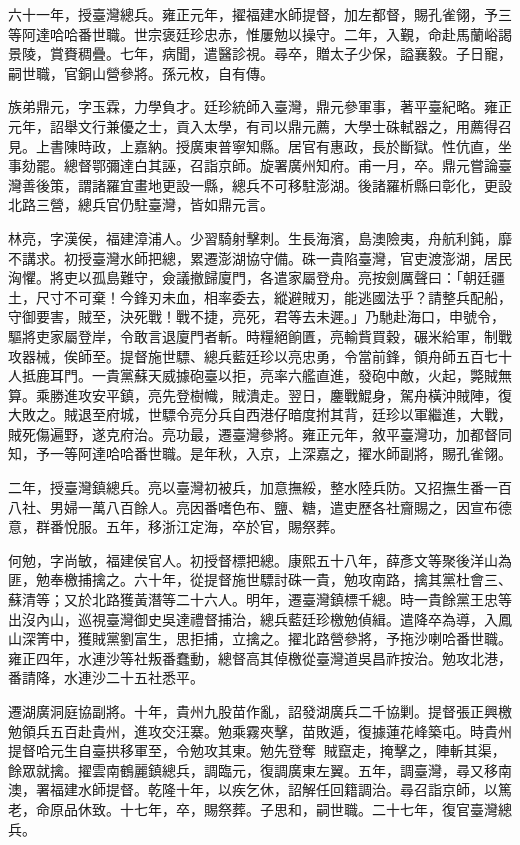 \begin{pinyinscope}
六十一年，授臺灣總兵。雍正元年，擢福建水師提督，加左都督，賜孔雀翎，予三等阿達哈哈番世職。世宗褒廷珍忠赤，惟屢勉以操守。二年，入覲，命赴馬蘭峪謁景陵，賞賚稠疊。七年，病聞，遣醫診視。尋卒，贈太子少保，謚襄毅。子日寵，嗣世職，官銅山營參將。孫元枚，自有傳。

族弟鼎元，字玉霖，力學負才。廷珍統師入臺灣，鼎元參軍事，著平臺紀略。雍正元年，詔舉文行兼優之士，貢入太學，有司以鼎元薦，大學士硃軾器之，用薦得召見。上書陳時政，上嘉納。授廣東普寧知縣。居官有惠政，長於斷獄。性伉直，坐事劾罷。總督鄂彌達白其誣，召詣京師。旋署廣州知府。甫一月，卒。鼎元嘗論臺灣善後策，謂諸羅宜畫地更設一縣，總兵不可移駐澎湖。後諸羅析縣曰彰化，更設北路三營，總兵官仍駐臺灣，皆如鼎元言。

林亮，字漢侯，福建漳浦人。少習騎射擊刺。生長海濱，島澳險夷，舟航利鈍，靡不講求。初授臺灣水師把總，累遷澎湖協守備。硃一貴陷臺灣，官吏渡澎湖，居民洶懼。將吏以孤島難守，僉議撤歸廈門，各遣家屬登舟。亮按劍厲聲曰：「朝廷疆土，尺寸不可棄！今鋒刃未血，相率委去，縱避賊刃，能逃國法乎？請整兵配船，守御要害，賊至，決死戰！戰不捷，亮死，君等去未遲。」乃馳赴海口，申號令，驅將吏家屬登岸，令敢言退廈門者斬。時糧絕餉匱，亮輸貲買穀，碾米給軍，制戰攻器械，俟師至。提督施世驃、總兵藍廷珍以亮忠勇，令當前鋒，領舟師五百七十人抵鹿耳門。一貴黨蘇天威據砲臺以拒，亮率六艦直進，發砲中敵，火起，斃賊無算。乘勝進攻安平鎮，亮先登樹幟，賊潰走。翌日，鏖戰鯤身，駕舟橫沖賊陣，復大敗之。賊退至府城，世驃令亮分兵自西港仔暗度拊其背，廷珍以軍繼進，大戰，賊死傷遍野，遂克府治。亮功最，遷臺灣參將。雍正元年，敘平臺灣功，加都督同知，予一等阿達哈哈番世職。是年秋，入京，上深嘉之，擢水師副將，賜孔雀翎。

二年，授臺灣鎮總兵。亮以臺灣初被兵，加意撫綏，整水陸兵防。又招撫生番一百八社、男婦一萬八百餘人。亮因番嗜色布、鹽、糖，遣吏歷各社齎賜之，因宣布德意，群番悅服。五年，移浙江定海，卒於官，賜祭葬。

何勉，字尚敏，福建侯官人。初授督標把總。康熙五十八年，薛彥文等聚後洋山為匪，勉奉檄捕擒之。六十年，從提督施世驃討硃一貴，勉攻南路，擒其黨杜會三、蘇清等；又於北路獲黃潛等二十六人。明年，遷臺灣鎮標千總。時一貴餘黨王忠等出沒內山，巡視臺灣御史吳達禮督捕治，總兵藍廷珍檄勉偵緝。遣降卒為導，入鳳山深箐中，獲賊黨劉富生，思拒捕，立擒之。擢北路營參將，予拖沙喇哈番世職。雍正四年，水連沙等社叛番蠢動，總督高其倬檄從臺灣道吳昌祚按治。勉攻北港，番請降，水連沙二十五社悉平。

遷湖廣洞庭協副將。十年，貴州九股苗作亂，詔發湖廣兵二千協剿。提督張正興檄勉領兵五百赴貴州，進攻交汪寨。勉乘霧夾擊，苗敗遁，復據蓮花峰築屯。時貴州提督哈元生自臺拱移軍至，令勉攻其東。勉先登奪，賊竄走，掩擊之，陣斬其渠，餘眾就擒。擢雲南鶴麗鎮總兵，調臨元，復調廣東左翼。五年，調臺灣，尋又移南澳，署福建水師提督。乾隆十年，以疾乞休，詔解任回籍調治。尋召詣京師，以篤老，命原品休致。十七年，卒，賜祭葬。子思和，嗣世職。二十七年，復官臺灣總兵。


\end{pinyinscope}
